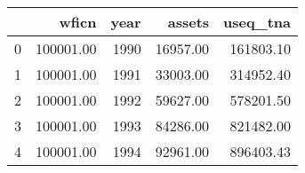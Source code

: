 \begin{tabular}{lrrrr}
\toprule
 & wficn & year & assets & useq_{tna} \\
\midrule
0 & 100001.00 & 1990 & 16957.00 & 161803.10 \\
1 & 100001.00 & 1991 & 33003.00 & 314952.40 \\
2 & 100001.00 & 1992 & 59627.00 & 578201.50 \\
3 & 100001.00 & 1993 & 84286.00 & 821482.00 \\
4 & 100001.00 & 1994 & 92961.00 & 896403.43 \\
\bottomrule
\end{tabular}
